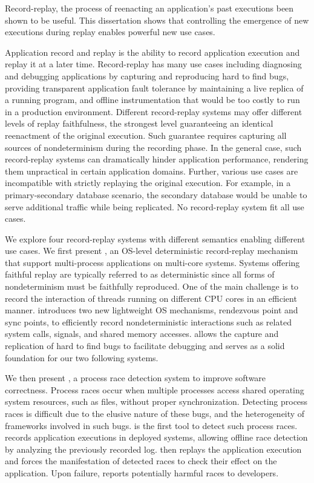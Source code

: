 Record-replay, the process of reenacting an application's past executions
been shown to be useful.
This dissertation shows that controlling the emergence of new executions during
replay enables powerful new use cases.

Application record and replay is the ability to record application execution and
replay it at a later time. Record-replay has many use cases including diagnosing and
debugging applications by capturing and reproducing hard to find bugs, providing
transparent application fault tolerance by maintaining a live replica of a running program,
and offline instrumentation that would be too costly to run in a production environment.
Different record-replay systems may offer different levels of replay faithfulness,
the strongest level guaranteeing an identical reenactment of the original execution.
Such guarantee requires capturing all sources of nondeterminism during the recording
phase. In the general case, such record-replay systems can dramatically hinder
application performance, rendering them unpractical in certain application domains.
Further, various use cases are incompatible with strictly replaying the original execution.
For example, in a primary-secondary database scenario, the secondary database
would be unable to serve additional traffic while being replicated.
No record-replay system fit all use cases.

We explore four record-replay systems with different semantics enabling different use cases.
We first present \scribe, an OS-level deterministic record-replay mechanism
that support multi-process applications on multi-core systems.
Systems offering faithful replay are typically referred to as deterministic
since all forms of nondeterminism must be faithfully reproduced.
One of the main
challenge is to record the interaction of threads running on different CPU cores
in an efficient manner.
\scribe introduces two new lightweight OS mechanisms, rendezvous point and sync
points, to efficiently record nondeterministic interactions such as related
system calls, signals, and shared memory accesses. \scribe allows the capture
and replication of hard to find bugs to facilitate debugging and serves as a
solid foundation for our two following systems.

We then present \racepro, a process race detection system to improve
software correctness. Process races occur when multiple processes access shared
operating system resources, such as files, without proper synchronization.
Detecting process races is difficult due to the elusive nature of these bugs,
and the heterogeneity of frameworks involved in such bugs.
\racepro is the first tool to detect such process races.
\racepro records application executions in deployed systems, allowing offline
race detection by analyzing the previously recorded log. \racepro then replays
the application execution and forces the manifestation of detected races to check their
effect on the application. Upon failure, \racepro reports potentially harmful
races to developers.

